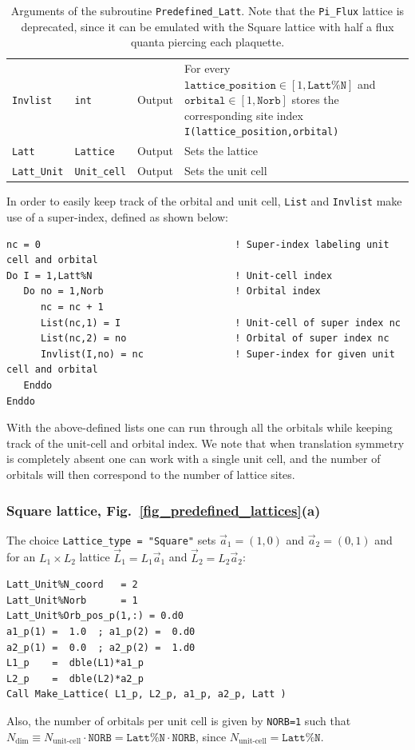 \begin{table}[h!]
\begin{center}
\begin{tabular}{@{} p{}  p{} p{} p{}  @{}}
		\texttt{Invlist}         & \texttt{int}        & Output &  For every $\texttt{lattice\_position} \in [1,\texttt{Latt\%N}]$ and $\texttt{orbital} \in [1,\texttt{Norb}]$ stores the corresponding site index \texttt{I(lattice\_position,orbital)}\\
		\texttt{Latt}            & \texttt{Lattice}    & Output & Sets the lattice\\
		\texttt{Latt\_Unit}      & \texttt{Unit\_cell} & Output & Sets the unit cell\\
		\bottomrule
	\end{tabular}
\caption{Arguments of the subroutine \texttt{Predefined\_Latt}.   Note that the \texttt{Pi\_Flux} lattice is deprecated, since it can be emulated with the Square lattice with half a flux quanta piercing each plaquette.}		\label{table:predefined_lattices}
\end{center}
\end{table}

In order to easily keep track of the orbital and unit cell, \texttt{List} and \texttt{Invlist} make use of a super-index, defined as shown below:
\begin{lstlisting}[style=fortran]
nc = 0                                  ! Super-index labeling unit cell and orbital
Do I = 1,Latt%N                         ! Unit-cell index 
   Do no = 1,Norb                       ! Orbital index
      nc = nc + 1
      List(nc,1) = I                    ! Unit-cell of super index nc
      List(nc,2) = no                   ! Orbital of super index nc
      Invlist(I,no) = nc                ! Super-index for given unit cell and orbital
   Enddo
Enddo
\end{lstlisting}
With the above-defined lists one can run through all the orbitals while keeping track of the unit-cell and orbital index. We note that when translation symmetry is completely absent one can work with a single unit cell, and the number of orbitals will then correspond to the number of lattice sites. 


\subsubsection{Square lattice, Fig.~\ref{fig_predefined_lattices}(a)}

The choice \texttt{Lattice\_type = "Square"}   sets $\vec{a}_1 =  (1,0) $ and $\vec{a}_2 =  (0,1) $  and for an $L_1 \times L_2$  lattice  $\vec{L}_1 = L_1 \vec{a}_1$ and  $\vec{L}_2 = L_2 \vec{a}_2$:
\begin{lstlisting}[style=fortran]
Latt_Unit%N_coord   = 2
Latt_Unit%Norb      = 1
Latt_Unit%Orb_pos_p(1,:) = 0.d0 
a1_p(1) =  1.0  ; a1_p(2) =  0.d0
a2_p(1) =  0.0  ; a2_p(2) =  1.d0
L1_p    =  dble(L1)*a1_p
L2_p    =  dble(L2)*a2_p
Call Make_Lattice( L1_p, L2_p, a1_p, a2_p, Latt )
\end{lstlisting}
Also, the number of orbitals per unit cell is given by \texttt{NORB=1} such that   $N_{\mathrm{dim}}   \equiv N_{\text{unit-cell}}   \cdot \texttt{NORB}  = \texttt{Latt\%N} \cdot \texttt{NORB}$, since $N_{\text{unit-cell}} = \texttt{Latt\%N}$.


